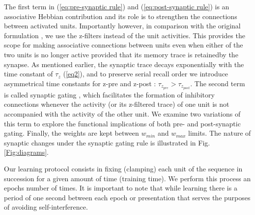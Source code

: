 \documentclass[10pt, a4paper]{article}
\begin{document}
The first term in (\ref{eq:pre-synaptic rule}) and (\ref{eq:post-synaptic rule}) is an associative Hebbian contribution \cite{hebb2005organization} and its role is to strengthen the connections between activated units. Importantly however, in comparison with the original formulation \cite{andrew2003spiking}, we use the z-filters instead of the unit activities. This provides the scope for making associative connections between units even when either of the two units is no longer active provided that its memory trace is retainedby the synapse. As mentioned earlier, the synaptic trace decays exponentially with the time constant of $\tau_z$ (\ref{eq2}), and to preserve serial recall order we introduce asymmetrical time constants for z-pre and z-post : $\tau_{z_{pre}} > \tau_{z_{post}}$. The second term is called synaptic gating \cite{andrew2003spiking}, which facilitates the formation of inhibitory connections whenever the activity (or its z-filtered trace) of one unit is not accompanied with the activity of the other unit. We examine two variations of this term to explore the functional implications of both pre- and post-synaptic gating. Finally, the weights are kept between $w_{min}$ and $w_{max}$ limits. The nature of synaptic changes under the synaptic gating rule is illustrated in Fig. \ref{Fig:diagrams}.


Our learning protocol consists in fixing (clamping) each unit of the sequence in succession for a given amount of time (training time). We perform this process an epochs number of times. It is important to note that while learning there is a period of one second between each epoch or presentation that serves the purposes of avoiding self-interference.  
\end{document}
